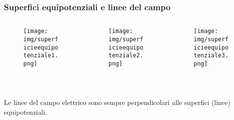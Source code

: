 \documentclass[]{beamer}
\theoremstyle{plain}
\begin{document}
\begin{frame}
\frametitle{Superfici equipotenziali e linee del campo}
\begin{columns}
\begin{column}{0.25\textwidth}
\begin{figure}
\texttt{[image: img/superficieequipotenziale1.png]}
\end{figure}
\end{column}
\begin{column}{0.25\textwidth}
\begin{figure}
\texttt{[image: img/superficieequipotenziale2.png]}
\end{figure}
\end{column}
\begin{column}{0.5\textwidth}
\begin{figure}
\texttt{[image: img/superficieequipotenziale3.png]}
\end{figure}
\end{column}
\end{columns}\pause

~

\alert{Le linee del campo elettrico sono sempre perpendicolari alle superfici (linee) equipotenziali.}
\end{frame}
\end{document}

